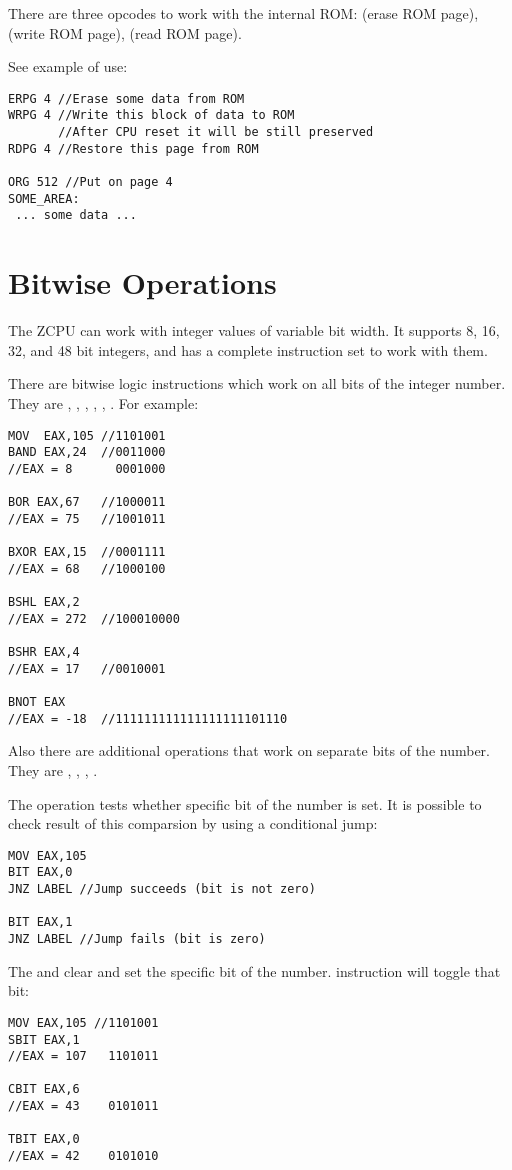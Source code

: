 There are three opcodes to work with the internal ROM:  (erase ROM page),  (write ROM page),  (read ROM page).

See example of use:
\begin{verbatim}
ERPG 4 //Erase some data from ROM
WRPG 4 //Write this block of data to ROM
       //After CPU reset it will be still preserved
RDPG 4 //Restore this page from ROM

ORG 512 //Put on page 4
SOME_AREA:
 ... some data ...
\end{verbatim}

\section{Bitwise Operations} \label{bitwiseops}
The ZCPU can work with integer values of variable bit width. It supports 8, 16, 32, and 48 bit integers, and has a complete instruction set to work with them.

There are bitwise logic instructions which work on all bits of the integer number. They are , , , , , . For example:
\begin{verbatim}
MOV  EAX,105 //1101001
BAND EAX,24  //0011000
//EAX = 8      0001000

BOR EAX,67   //1000011
//EAX = 75   //1001011

BXOR EAX,15  //0001111
//EAX = 68   //1000100

BSHL EAX,2
//EAX = 272  //100010000

BSHR EAX,4
//EAX = 17   //0010001

BNOT EAX
//EAX = -18  //111111111111111111101110
\end{verbatim}

Also there are additional operations that work on separate bits of the number. They are , , , .

The  operation tests whether specific bit of the number is set. It is possible to check result of this comparsion by using a conditional jump:
\begin{verbatim}
MOV EAX,105
BIT EAX,0
JNZ LABEL //Jump succeeds (bit is not zero)

BIT EAX,1
JNZ LABEL //Jump fails (bit is zero)
\end{verbatim}

The  and  clear and set the specific bit of the number.  instruction will toggle that bit:
\begin{verbatim}
MOV EAX,105 //1101001
SBIT EAX,1
//EAX = 107   1101011

CBIT EAX,6
//EAX = 43    0101011

TBIT EAX,0
//EAX = 42    0101010
\end{verbatim}

